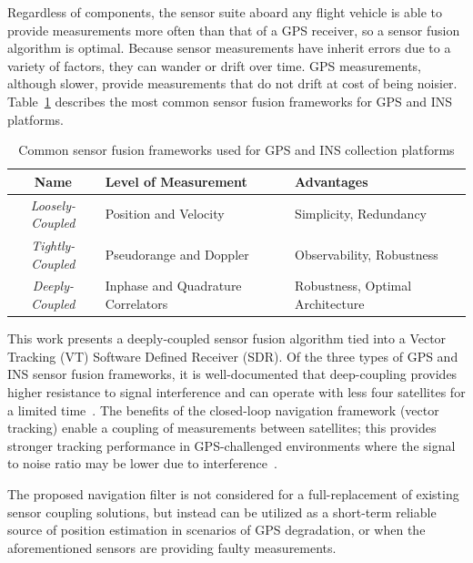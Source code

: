 Regardless of components, the sensor suite aboard any flight vehicle is able to provide measurements more often than that of a GPS receiver, so a sensor fusion algorithm is optimal. Because sensor measurements have inherit errors due to a variety of factors, they can wander or drift over time. GPS measurements, although slower, provide measurements that do not drift at cost of being noisier. Table~\ref{tbl:sensorfusionframeworks} describes the most common sensor fusion frameworks for GPS and INS platforms.
\begin{table}[!ht]\label{tbl:sensorfusionframeworks}
    \caption{Common sensor fusion frameworks used for GPS and INS collection platforms}
    \centering
    \begin{tabular}{cll}
        \toprule
        \textbf{Name}            & \textbf{Level of Measurement}      & \textbf{Advantages}              \\
        \midrule
        \textit{Loosely-Coupled} & Position and Velocity              & Simplicity, Redundancy           \\
        \textit{Tightly-Coupled} & Pseudorange and Doppler            & Observability, Robustness        \\
        \textit{Deeply-Coupled}  & Inphase and Quadrature Correlators & Robustness, Optimal Architecture \\
        \bottomrule
    \end{tabular}
\end{table}

This work presents a deeply-coupled sensor fusion algorithm tied into a Vector Tracking (VT) Software Defined Receiver (SDR). Of the three types of GPS and INS sensor fusion frameworks, it is well-documented that deep-coupling provides higher resistance to signal interference and can operate with less four satellites for a limited time~\cite{wattsGPSGLONASSL12019}. The benefits of the closed-loop navigation framework (vector tracking) enable a coupling of measurements between satellites; this provides stronger tracking performance in GPS-challenged environments where the signal to noise ratio may be lower due to interference~\cite{grierPositionNavigationTiming}.

The proposed navigation filter is not considered for a full-replacement of existing sensor coupling solutions, but instead can be utilized as a short-term reliable source of position estimation in scenarios of GPS degradation, or when the aforementioned sensors are providing faulty measurements.

